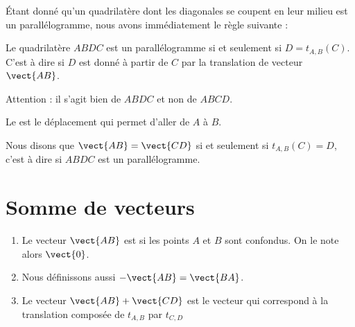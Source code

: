 \begin{center}
   
\end{center}

Étant donné qu'un quadrilatère dont les diagonales se coupent en leur milieu est un parallélogramme, nous avons immédiatement le règle suivante :
\begin{Aretenir}
    Le quadrilatère \( ABDC\) est un parallélogramme si et seulement si \( D=t_{A,B}(C)\). C'est à dire si \( D\) est donné à partir de \( C\) par la translation de vecteur \( \vect{ AB }\).

Attention : il s'agit bien de \( ABDC\) et non de \( ABCD\).
\end{Aretenir}


    Le   est le déplacement qui permet d'aller de $A$ à \( B\).

\begin{definition}
    Nous disons que \( \vect{ AB }=\vect{ CD }\) si et seulement si \( t_{A,B}(C)=D\), c'est à dire si \( ABDC\) est un parallélogramme.
\end{definition}

\section{Somme de vecteurs}

\begin{definition}
    \begin{enumerate}
        \item
    Le vecteur \( \vect{ AB }\) est  si les points \( A\) et \( B\) sont confondus. On le note alors \( \vect{ 0 }\).

        \item
    Nous définissons aussi \( -\vect{ AB }=\vect{ BA }\).

\item

    Le vecteur  \( \vect{ AB }+\vect{ CD }\) est le vecteur qui correspond à la translation composée de \( t_{A,B}\) par \( t_{C,D}\)
    \end{enumerate}
\end{definition}

